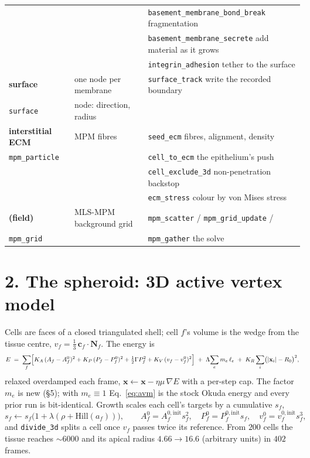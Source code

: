 \documentclass[10pt,a4paper]{article}
\newcommand{\op}[1]{\texttt{#1}}
\begin{document}
{\begin{tabular}{@{}lll@{}}
                             &                         & \op{basement\_membrane\_bond\_break} \quad fragmentation\\
                             &                         & \op{basement\_membrane\_secrete} \quad add material as it grows\\
                             &                         & \op{integrin\_adhesion} \quad tether to the surface\\
\midrule
\textbf{surface}             & one node per membrane   & \op{surface\_track} \quad write the recorded boundary\\
\op{surface}                 & node: direction, radius &\\
\midrule
\textbf{interstitial ECM}    & MPM fibres              & \op{seed\_ecm} \quad fibres, alignment, density\\
\op{mpm\_particle}           &                         & \op{cell\_to\_ecm} \quad the epithelium's push\\
                             &                         & \op{cell\_exclude\_3d} \quad non-penetration backstop\\
                             &                         & \op{ecm\_stress} \quad colour by von Mises stress\\
\midrule
\textbf{(field)}             & MLS-MPM background grid & \op{mpm\_scatter} / \op{mpm\_grid\_update} /\\
\op{mpm\_grid}               &                         & \op{mpm\_gather} \quad the solve\\
\bottomrule
\end{tabular}}
\smallskip

\section*{2.\; The spheroid: 3D active vertex model}

Cells are faces of a closed triangulated shell; cell $f$'s volume is the wedge from the tissue centre,
$v_f=\tfrac13\,\mathbf{c}_f\!\cdot\!\mathbf{N}_f$. The energy is
%
\begin{equation}
E \;=\; \sum_f\Bigl[K_A\,(A_f-A_f^0)^2 + K_P\,(P_f-P_f^0)^2 + \tfrac12\Gamma P_f^2 + K_V\,(v_f-v_f^0)^2\Bigr]
\;+\;\Lambda\!\sum_e m_e\,\ell_e\;+\;K_R\sum_i\bigl(|\mathbf{x}_i|-R_0\bigr)^2 ,
\label{eq:avm}
\end{equation}
%
relaxed overdamped each frame, $\mathbf{x}\leftarrow\mathbf{x}-\eta\mu\,\nabla E$ with a per-step cap.
The factor $m_e$ is new (\S5); with $m_e\equiv1$ Eq.~\eqref{eq:avm} is the stock Okuda energy and every
prior run is bit-identical. Growth scales each cell's targets by a cumulative $s_f$,
%
\begin{equation}
s_f \leftarrow s_f\bigl(1+\lambda(\rho+\mathrm{Hill}(a_f))\bigr),\qquad
A_f^0=A_f^{0,\text{init}}s_f^2,\quad P_f^0=P_f^{0,\text{init}}s_f,\quad v_f^0=v_f^{0,\text{init}}s_f^3,
\label{eq:growth}
\end{equation}
%
and \op{divide\_3d} splits a cell once $v_f$ passes twice its reference. From $200$ cells the tissue
reaches $\sim6000$ and its apical radius $4.66\to16.6$ (arbitrary units) in $402$ frames.
\end{document}
